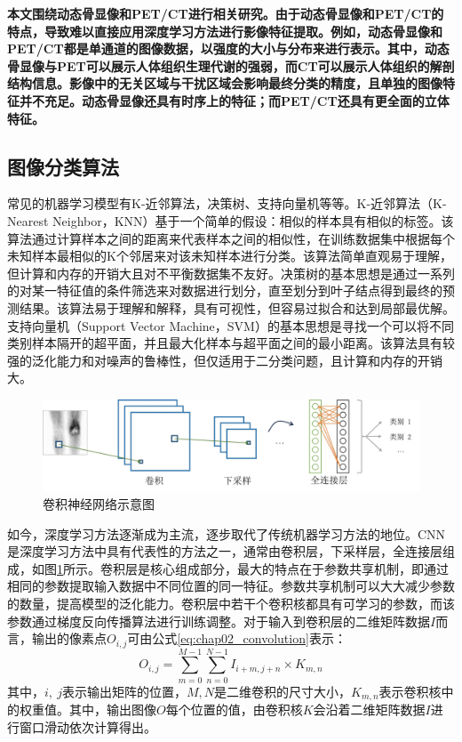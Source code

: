 \textbf{本文围绕动态骨显像和PET/CT进行相关研究。由于动态骨显像和PET/CT的特点，导致难以直接应用深度学习方法进行影像特征提取。例如，动态骨显像和PET/CT都是单通道的图像数据，以强度的大小与分布来进行表示。其中，动态骨显像与PET可以展示人体组织生理代谢的强弱，而CT可以展示人体组织的解剖结构信息。影像中的无关区域与干扰区域会影响最终分类的精度，且单独的图像特征并不充足。动态骨显像还具有时序上的特征；而PET/CT还具有更全面的立体特征。}

\subsection{图像分类算法}

常见的机器学习模型有K-近邻算法，决策树、支持向量机等等。K-近邻算法（K-Nearest Neighbor，KNN）\cite{guo2003knn}基于一个简单的假设：相似的样本具有相似的标签。该算法通过计算样本之间的距离来代表样本之间的相似性，在训练数据集中根据每个未知样本最相似的K个邻居来对该未知样本进行分类。该算法简单直观易于理解，但计算和内存的开销大且对不平衡数据集不友好。决策树\cite{suthaharan2016decision}的基本思想是通过一系列的对某一特征值的条件筛选来对数据进行划分，直至划分到叶子结点得到最终的预测结果。该算法易于理解和解释，具有可视性，但容易过拟合和达到局部最优解。支持向量机（Support Vector Machine，SVM）\cite{suthaharan2016support}的基本思想是寻找一个可以将不同类别样本隔开的超平面，并且最大化样本与超平面之间的最小距离。该算法具有较强的泛化能力和对噪声的鲁棒性，但仅适用于二分类问题，且计算和内存的开销大。

\begin{figure}[h]
  \centering
  \includegraphics[width=\textwidth]{figures/chap02_cnn.jpg}
  \caption{卷积神经网络示意图}
  \label{fig:chap02_cnn}
\end{figure}

如今，深度学习方法逐渐成为主流，逐步取代了传统机器学习方法的地位。CNN是深度学习方法中具有代表性的方法之一，通常由卷积层，下采样层，全连接层组成，如图\ref{fig:chap02_cnn}所示。卷积层是核心组成部分，最大的特点在于参数共享机制，即通过相同的参数提取输入数据中不同位置的同一特征。参数共享机制可以大大减少参数的数量，提高模型的泛化能力。卷积层中若干个卷积核都具有可学习的参数，而该参数通过梯度反向传播算法进行训练调整。对于输入到卷积层的二维矩阵数据\(I\)而言，输出的像素点\(O_{i,j}\)可由公式\ref{eq:chap02_convolution}表示：
\begin{equation}
  O_{i,j} = \sum_{m=0}^{M-1}\sum_{n=0}^{N-1}I_{i+m, j+n}\times K_{m,n}
  \label{eq:chap02_convolution}
\end{equation}
其中，\(i,\ j\)表示输出矩阵的位置，\(M,N\)是二维卷积的尺寸大小，\(K_{m,n}\)表示卷积核中的权重值。其中，输出图像\(O\)每个位置的值，由卷积核\(K\)会沿着二维矩阵数据\(I\)进行窗口滑动依次计算得出。

